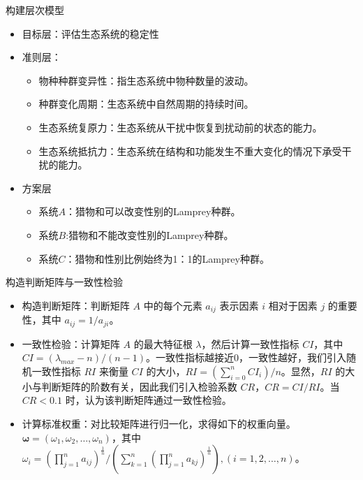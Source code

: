 \documentclass{beamer}
\begin{document}
\begin{frame}{构建层次模型}
    \begin{itemize}
        \item 目标层：评估生态系统的稳定性
        \item 准则层：
            \begin{itemize}
                \item 物种种群变异性：指生态系统中物种数量的波动。
                \item 种群变化周期：生态系统中自然周期的持续时间。             
                \item 生态系统复原力：生态系统从干扰中恢复到扰动前的状态的能力。
                \item 生态系统抵抗力：生态系统在结构和功能发生不重大变化的情况下承受干扰的能力。
            \end{itemize}
            
        \item 方案层
            \begin{itemize}
                \item 系统$A$：猎物和可以改变性别的Lamprey种群。
                \item 系统$B$:猎物和不能改变性别的Lamprey种群。             
                \item 系统$C$：猎物和性别比例始终为1：1的Lamprey种群。
            \end{itemize}
    \end{itemize}

\end{frame}


\begin{frame}{构造判断矩阵与一致性检验}
    \begin{itemize}
        \item 构造判断矩阵：判断矩阵 $A$ 中的每个元素 $a_{ij}$ 表示因素 $i$ 相对于因素 $j$ 的重要性，其中 $a_{ij} = 1/a_{ji}$。
        \item 一致性检验：计算矩阵 $A$ 的最大特征根 $\lambda$，然后计算一致性指标 $CI$，其中 $CI = (\lambda_{max} - n)/(n - 1)$。一致性指标越接近0，一致性越好，我们引入随机一致性指标 $RI$ 来衡量 $CI$ 的大小，$RI = (\sum_{i=0}^{n} CI_i) / n$。显然，$RI$ 的大小与判断矩阵的阶数有关，因此我们引入检验系数 $CR$，$CR = CI / RI$。当 $CR < 0.1$ 时，认为该判断矩阵通过一致性检验。
        \item 计算标准权重：对比较矩阵进行归一化，求得如下的权重向量。$\boldsymbol{\omega} = (\omega_1, \omega_2, \dots, \omega_n)$，其中 $\omega_i = \left(\prod_{j=1}^{n} a_{ij}\right)^{\frac{1}{n}} / \left(\sum_{k=1}^{n} \left(\prod_{j=1}^{n} a_{kj}\right)^{\frac{1}{n}}\right), (i=1,2,\dots,n)$。
    \end{itemize}
\end{frame}
\end{document}

